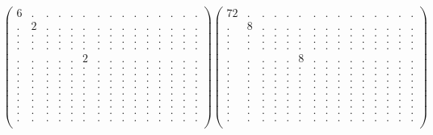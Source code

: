 \documentclass[12pt,a4paper]{amsart}
\begin{document}
\begin{align*}
\left(\begin{array}{rrrrrrrrrrrrrrr}%
6&.&.&.&.&.&.&.&.&.&.&.&.&.&.\\%
.&2&.&.&.&.&.&.&.&.&.&.&.&.&.\\%
.&.&.&.&.&.&.&.&.&.&.&.&.&.&.\\%
.&.&.&.&.&.&.&.&.&.&.&.&.&.&.\\%
.&.&.&.&.&.&.&.&.&.&.&.&.&.&.\\%
.&.&.&.&.&2&.&.&.&.&.&.&.&.&.\\%
.&.&.&.&.&.&.&.&.&.&.&.&.&.&.\\%
.&.&.&.&.&.&.&.&.&.&.&.&.&.&.\\%
.&.&.&.&.&.&.&.&.&.&.&.&.&.&.\\%
.&.&.&.&.&.&.&.&.&.&.&.&.&.&.\\%
.&.&.&.&.&.&.&.&.&.&.&.&.&.&.\\%
.&.&.&.&.&.&.&.&.&.&.&.&.&.&.\\%
.&.&.&.&.&.&.&.&.&.&.&.&.&.&.\\%
.&.&.&.&.&.&.&.&.&.&.&.&.&.&.\\%
.&.&.&.&.&.&.&.&.&.&.&.&.&.&.\\%
\end{array}\right)%
\left(\begin{array}{rrrrrrrrrrrrrrr}%
72&.&.&.&.&.&.&.&.&.&.&.&.&.&.\\%
.&8&.&.&.&.&.&.&.&.&.&.&.&.&.\\%
.&.&.&.&.&.&.&.&.&.&.&.&.&.&.\\%
.&.&.&.&.&.&.&.&.&.&.&.&.&.&.\\%
.&.&.&.&.&.&.&.&.&.&.&.&.&.&.\\%
.&.&.&.&.&8&.&.&.&.&.&.&.&.&.\\%
.&.&.&.&.&.&.&.&.&.&.&.&.&.&.\\%
.&.&.&.&.&.&.&.&.&.&.&.&.&.&.\\%
.&.&.&.&.&.&.&.&.&.&.&.&.&.&.\\%
.&.&.&.&.&.&.&.&.&.&.&.&.&.&.\\%
.&.&.&.&.&.&.&.&.&.&.&.&.&.&.\\%
.&.&.&.&.&.&.&.&.&.&.&.&.&.&.\\%
.&.&.&.&.&.&.&.&.&.&.&.&.&.&.\\%
.&.&.&.&.&.&.&.&.&.&.&.&.&.&.\\%
.&.&.&.&.&.&.&.&.&.&.&.&.&.&.\\%
\end{array}\right)%
\end{align*}
\end{document}
